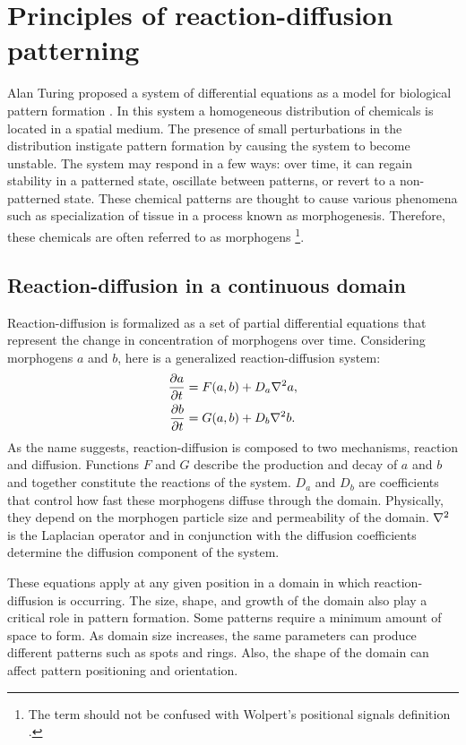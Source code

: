 \chapter{Principles of reaction-diffusion patterning} 
Alan Turing proposed a system of differential equations as a model for biological pattern formation \citep{Turing1952}. In this system a homogeneous distribution of chemicals is located in a spatial medium. The presence of small perturbations in the distribution instigate pattern formation by causing the system to become unstable. The system may respond in a few ways: over time, it can regain stability in a patterned state, oscillate between patterns, or revert to a non-patterned state. These chemical patterns are thought to cause various phenomena such as specialization of tissue in a process known as morphogenesis. Therefore, these chemicals are often referred to as morphogens \footnote{The term  should not be confused with Wolpert’s positional signals definition \citep{WolpertLewis1996}.}.

\section{Reaction-diffusion in a continuous domain}
Reaction-diffusion is formalized as a set of partial differential equations that represent the change in concentration of morphogens over time. Considering morphogens $a$ and $b$, here is a generalized reaction-diffusion system:
	\begin{equation}
	\begin{aligned} \label{eq:basicRD}
		\frac{\partial a}{\partial t} &= F(a, b) + D_a \nabla^2 a,\\
		\frac{\partial b}{\partial t} &= G(a, b) + D_b \nabla^2 b.
	\end{aligned}
	\end{equation}
As the name suggests, reaction-diffusion is composed to two mechanisms, reaction and diffusion. Functions $F$ and $G$ describe the production and decay of $a$ and $b$ and together constitute the reactions of the system. $D_a$ and $D_b$ are coefficients that control how fast these morphogens diffuse through the domain. Physically, they depend on the morphogen particle size and permeability of the domain. $\nabla^2{}$ is the Laplacian operator and in conjunction with the diffusion coefficients determine the diffusion component of the system.

These equations apply at any given position in a domain in which reaction-diffusion is occurring. The size, shape, and growth of the domain also play a critical role in pattern formation. Some patterns require a minimum amount of space to form. As domain size increases, the same parameters can produce different patterns such as spots and rings. Also, the shape of the domain can affect pattern positioning and orientation.

